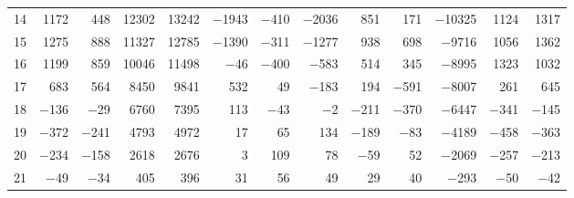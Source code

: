 \begin{table}[H]
\begin{tabular}{crrrrrrrrrrrr}
        14 & 1172 & 448 & 12302 & 13242 & $-$1943 & $-$410 & $-$2036 & 851 & 171 & $-$10325 & 1124 & 1317 \\
        15 & 1275 & 888 & 11327 & 12785 & $-$1390 & $-$311 & $-$1277 & 938 & 698 & $-$9716 & 1056 & 1362 \\
        16 & 1199 & 859 & 10046 & 11498 & $-$46 & $-$400 & $-$583 & 514 & 345 & $-$8995 & 1323 & 1032 \\
        17 & 683 & 564 & 8450 & 9841 & 532 & 49 & $-$183 & 194 & $-$591 & $-$8007 & 261 & 645 \\
        18 & $-$136 & $-$29 & 6760 & 7395 & 113 & $-$43 & $-$2 & $-$211 & $-$370 & $-$6447 & $-$341 & $-$145 \\
        19 & $-$372 & $-$241 & 4793 & 4972 & 17 & 65 & 134 & $-$189 & $-$83 & $-$4189 & $-$458 & $-$363 \\
        20 & $-$234 & $-$158 & 2618 & 2676 & 3 & 109 & 78 & $-$59 & 52 & $-$2069 & $-$257 & $-$213 \\
        21 & $-$49 & $-$34 & 405 & 396 & 31 & 56 & 49 & 29 & 40 & $-$293 & $-$50 & $-$42 \\
        \hline
    \end{tabular}
\end{table}

